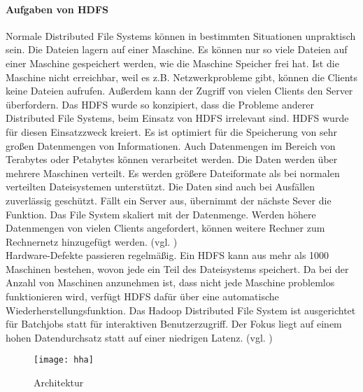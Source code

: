 \paragraph{Aufgaben von HDFS}$\;$ \\
Normale Distributed File Systems können in bestimmten Situationen unpraktisch sein. Die Dateien lagern auf einer Maschine. Es können nur so viele Dateien auf einer Maschine gespeichert werden, wie die Maschine Speicher frei hat. Ist die Maschine nicht erreichbar, weil es z.B. Netzwerkprobleme gibt, können die Clients keine Dateien aufrufen. Außerdem kann der Zugriff von vielen Clients den Server überfordern. Das HDFS wurde so konzipiert, dass die Probleme anderer Distributed File Systems, beim Einsatz von HDFS irrelevant sind. HDFS wurde für diesen Einsatzzweck kreiert. Es ist optimiert für die Speicherung von sehr großen Datenmengen von Informationen. Auch Datenmengen im Bereich von Terabytes oder Petabytes können verarbeitet werden. Die Daten werden über mehrere Maschinen verteilt. Es werden größere Dateiformate als bei normalen verteilten Dateisystemen unterstützt. Die Daten sind auch bei Ausfällen zuverlässig geschützt. Fällt ein Server aus, übernimmt der nächste Sever die Funktion. Das File System skaliert mit der Datenmenge. Werden höhere Datenmengen von vielen Clients angefordert, können weitere Rechner zum Rechnernetz hinzugefügt werden. (vgl. \cite{yahoo})\\
Hardware-Defekte passieren regelmäßig. Ein HDFS kann aus mehr als 1000 Maschinen bestehen, wovon jede ein Teil des Dateisystems speichert. Da bei der Anzahl von Maschinen anzunehmen ist, dass nicht jede Maschine problemlos funktionieren wird, verfügt HDFS dafür über eine automatische Wiederherstellungsfunktion. Das Hadoop Distributed File System ist ausgerichtet für Batchjobs statt für interaktiven Benutzerzugriff. Der Fokus liegt auf einem hohen Datendurchsatz statt auf einer niedrigen Latenz. (vgl. \cite{archguid})

\begin{figure}[h!]
    \centering
    \texttt{[image: hha]}
    \caption{Architektur\cite{uwes}}
    \label{fig:Architektur}
\end{figure}

